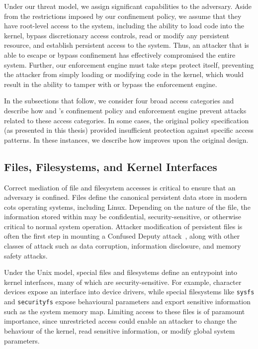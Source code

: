 Under our threat model, we assign significant capabilities to the adversary. Aside from the
restrictions imposed by our confinement policy, we assume that they have root-level access
to the system, including the ability to load code into the kernel, bypass discretionary
access controls, read or modify any persistent resource, and establish persistent access
to the system. Thus, an attacker that is able to escape or bypass confinement has
effectively compromised the entire system. Further, our enforcement engine must take steps
protect itself, preventing the attacker from simply loading or modifying code in the
kernel, which would result in the ability to tamper with or bypass the enforcement engine.

In the subsections that follow, we consider four broad access categories and describe how
\bpfbox{} and \bpfcontain{}'s confinement policy and enforcement engine prevent attacks
related to these access categories. In some cases, the original \bpfbox{} policy
specification (as presented in this thesis) provided insufficient protection against
specific access patterns. In these instances, we describe how \bpfcontain{} improves upon
the original \bpfbox{} design.

\subsection{Files, Filesystems, and Kernel Interfaces}

Correct mediation of file and filesystem accesses is critical to ensure that an adversary
is confined. Files define the canonical persistent data store in modern \gls{cots}
operating systems, including Linux. Depending on the nature of the file, the information
stored within may be confidential, security-sensitive, or otherwise critical to normal
system operation. Attacker modification of persistent files is often the first step in
mounting a Confused Deputy attack~\cite{hardy1988_confused_deputy}, along with other
classes of attack such as data corruption, information disclosure, and memory safety
attacks.

Under the Unix model, special files and filesystems define an entrypoint into kernel
interfaces, many of which are security-sensitive. For example, character devices expose an
interface into device drivers, while special filesystems like \texttt{sysfs} and
\texttt{securityfs} expose behavioural parameters and export sensitive information such as
the system memory map. Limiting access to these files is of paramount importance, since
unrestricted access could enable an attacker to change the behaviour of the kernel, read
sensitive information, or modify global system parameters.

